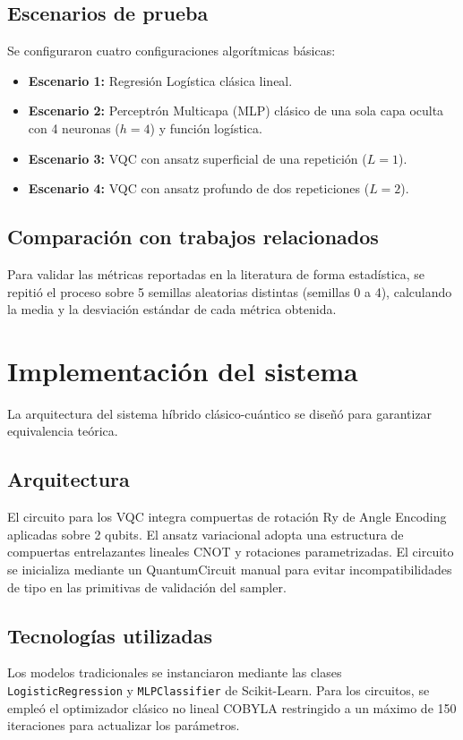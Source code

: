 \documentclass[12pt,oneside]{report}
\begin{document}
\subsection{Escenarios de prueba}
Se configuraron cuatro configuraciones algorítmicas básicas:
\begin{itemize}
    \item \textbf{Escenario 1:} Regresión Logística clásica lineal.
    \item \textbf{Escenario 2:} Perceptrón Multicapa (MLP) clásico de una sola capa oculta con 4 neuronas ($h = 4$) y función logística.
    \item \textbf{Escenario 3:} VQC con ansatz superficial de una repetición ($L=1$).
    \item \textbf{Escenario 4:} VQC con ansatz profundo de dos repeticiones ($L=2$).
\end{itemize}

\subsection{Comparación con trabajos relacionados}
Para validar las métricas reportadas en la literatura de forma estadística, se repitió el proceso sobre 5 semillas aleatorias distintas (semillas 0 a 4), calculando la media y la desviación estándar de cada métrica obtenida.

\section{Implementación del sistema}
La arquitectura del sistema híbrido clásico-cuántico se diseñó para garantizar equivalencia teórica.
\subsection{Arquitectura}
El circuito para los VQC integra compuertas de rotación Ry de Angle Encoding aplicadas sobre 2 qubits. El ansatz variacional adopta una estructura de compuertas entrelazantes lineales CNOT y rotaciones parametrizadas. El circuito se inicializa mediante un QuantumCircuit manual para evitar incompatibilidades de tipo en las primitivas de validación del sampler.

\subsection{Tecnologías utilizadas}
Los modelos tradicionales se instanciaron mediante las clases \texttt{LogisticRegression} y \texttt{MLPClassifier} de Scikit-Learn. Para los circuitos, se empleó el optimizador clásico no lineal COBYLA restringido a un máximo de 150 iteraciones para actualizar los parámetros.
\end{document}
